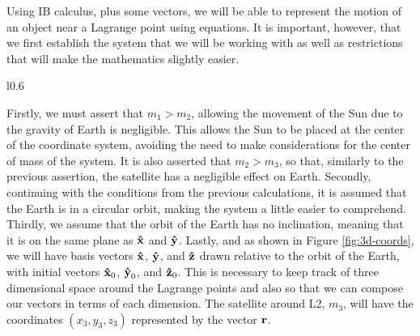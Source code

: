 Using IB calculus, plus some vectors, we will be able to represent the motion of an object near a Lagrange point using equations.
It is important, however, that we first establish the system that we will be working with as well as restrictions that will make the mathematics slightly easier.
\begin{wrapfigure}{l}{0.6\textwidth}
	\centering
	\vspace*{0.25cm}
	\caption{three-dimensional diagram of the Sun-Earth system with unit vectors relative to the Earth's orbit. Not drawn to scale.}
	\label{fig:3d-coords}
\end{wrapfigure}
Firstly, we must assert that $m_1 > m_2$, allowing the movement of the Sun due to the gravity of Earth is negligible.
This allows the Sun to be placed at the center of the coordinate system, avoiding the need to make considerations for the center of mass of the system.
It is also asserted that $m_2 > m_3$, so that, similarly to the previous assertion, the satellite has a negligible effect on Earth.
Secondly, continuing with the conditions from the previous calculations, it is assumed that the Earth is in a circular orbit, making the system a little easier to comprehend.
Thirdly, we assume that the orbit of the Earth has no inclination, meaning that it is on the same plane as $\uvec{x}$ and $\uvec{y}$.
Lastly, and as shown in Figure \ref{fig:3d-coords}, we will have basis vectors $\uvec{x}$, $\uvec{y}$, and $\uvec{z}$ drawn relative to the orbit of the Earth, with initial vectors $\uvec{x}_0$, $\uvec{y}_0$, and $\uvec{z}_0$.
This is necessary to keep track of three dimensional space around the Lagrange points and also so that we can compose our vectors in terms of each dimension.
The satellite around L2, $m_3$, will have the coordinates $(x_3,y_3,z_3)$ represented by the vector $\bm{\mathbf{r}}$.

